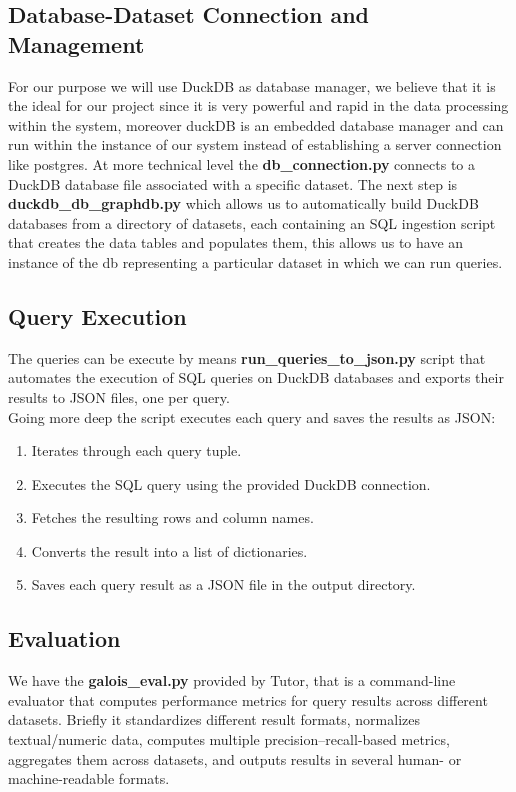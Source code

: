 \documentclass[12pt,a4paper]{article}
\begin{document}
\subsection{Database-Dataset Connection and Management}
For our purpose we will use DuckDB as database manager, we believe that it is the ideal for our project since it is very powerful and rapid in the data processing within the system, moreover duckDB is an embedded database manager and can run within the instance of our system instead of establishing a server connection like postgres.
At more technical level the \textbf{db\_connection.py} connects to a DuckDB database file associated with a specific dataset.
The next step is \textbf{duckdb\_db\_graphdb.py} which allows us to automatically build DuckDB databases from a directory of datasets, each containing an SQL ingestion script that creates the data tables and populates them,  this allows us to have an instance of the db representing a particular dataset  in which we can run queries.

\subsection{Query Execution}
The queries can be execute by means \textbf{run\_queries\_to\_json.py} script that automates the execution of SQL queries on DuckDB databases and exports their results to JSON files, one per query.\\
Going more deep the script executes each query and saves the results as JSON:

\begin{enumerate}
    \item Iterates through each query tuple.
    \item Executes the SQL query using the provided DuckDB connection.
    \item Fetches the resulting rows and column names.
    \item Converts the result into a list of dictionaries.
    \item Saves each query result as a JSON file in the output directory.
\end{enumerate}

\subsection{Evaluation}
We have the \textbf{galois\_eval.py} provided by Tutor, that is a command-line evaluator that computes performance metrics for query results across different datasets.
Briefly it standardizes different result formats, normalizes textual/numeric data, computes multiple precision–recall-based metrics, aggregates them across datasets, and outputs results in several human- or machine-readable formats.
\end{document}
